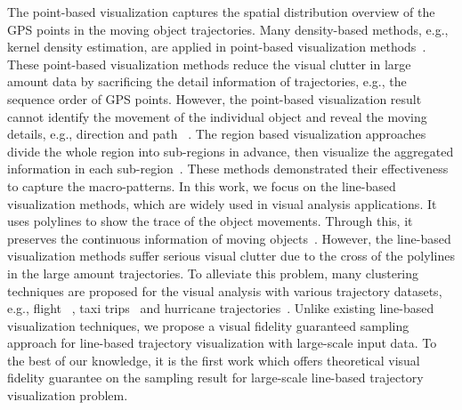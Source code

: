 The point-based visualization captures the spatial distribution overview of the GPS points in the moving object trajectories.
Many density-based methods, e.g., kernel density estimation, are applied in point-based visualization methods~\cite{liu2013vait,yang2016exploring,chae2014public,xie2008kernel, borruso2008network}.
These point-based visualization methods reduce the visual clutter in large amount data by sacrificing the detail information of trajectories, e.g., the sequence order of GPS points.
However, the point-based visualization result cannot identify the movement of the individual object and reveal the moving details, e.g.,  direction and path ~\cite{chen2015survey}.
The region based visualization approaches divide the whole region into sub-regions in advance, then visualize the aggregated information in each sub-region~\cite{guo2009flow,wood2010visualisation,von2015mobilitygraphs}.
These methods demonstrated their effectiveness to capture the macro-patterns.
In this work, we focus on the line-based visualization methods, which are widely used in visual analysis applications.
It uses polylines to show the trace of the object movements.
Through this, it preserves the continuous information of moving objects~\cite{guo2011tripvista,hurter2009fromdady}.
However, the line-based visualization methods suffer serious visual clutter due to the cross of the polylines in the large amount trajectories.
To alleviate this problem, many clustering techniques are proposed for the visual analysis with various trajectory datasets, e.g., flight ~\cite{ferreira2013vector}, taxi trips~\cite{rinzivillo2008visually} and hurricane trajectories~\cite{andrienko2017clustering}.
Unlike existing line-based visualization techniques, we propose a visual fidelity  guaranteed sampling approach for line-based trajectory visualization with large-scale input data.
To the best of our knowledge, it is the first work which offers theoretical visual fidelity guarantee on the sampling result for large-scale line-based trajectory visualization problem.





